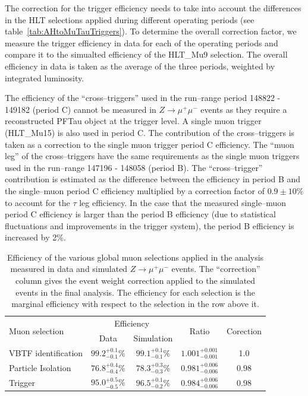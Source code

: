 The correction for the trigger efficiency needs to take into account the
differences in the HLT selections applied during different operating periods
(see table~\ref{tab:AHtoMuTauTriggers}).  To determine the overall correction
factor, we measure the trigger efficiency in data for each of the operating
periods and compare it to the simualted efficiency of the HLT\_Mu9 selection.
The overall efficiency in data is taken as the average of the three periods,
weighted by integrated luminosity.

The efficiency of the ``cross--triggers'' used in the run--range period 148822 -
149182 (period C) cannot be measured in $Z\rightarrow\mu^+\mu^-$ events as they
require a reconstructed PFTau object at the trigger level.  A single muon trigger
(HLT\_Mu15) is also used in period C.  The contribution of the cross--triggers
is taken as a correction to the single muon trigger period C efficiency. The
``muon leg'' of the cross--triggers have the same requirements as the single
muon triggers used in the run--range 147196 - 148058 (period B).  The
``cross--trigger'' contribution is estimated as the difference between the
efficiency in period B and the single--muon period C efficiency multiplied by a
correction factor of $0.9 \pm 10\%$ to account for the $\tau$ leg efficiency.
In the case that the measured single--muon period C efficiency is larger than
the period B efficiency (due to statistical fluctuations and improvements in the
trigger system), the period B efficiency is increased by 2\%.

\begin{table}[t]
\begin{center}
\begin{tabular}{|l|c|c|c|c|}
\hline
\multirow{2}{*}{Muon selection} &  \multicolumn{2}{|c|}{Efficiency} & \multirow{2}{*}{Ratio} & \multirow{2}{*}{Corection} \\ 
&  Data  &          Simulation &      &      \\ 
\hline
VBTF identification &   $99.2^{+0.1}_{-0.1}$\%  &  $99.1^{+0.1}_{-0.1}$\% & $1.001^{+0.001}_{-0.001}$ & 1.0\\
Particle Isolation  &  $76.8^{+0.4}_{-0.4}$\% &  $78.3^{+0.3}_{-0.3}$\% & $0.981^{+0.006}_{-0.006}$ & 0.98 \\
Trigger             &   $95.0^{+0.5}_{-0.5}$\% & $96.5^{+0.1}_{-0.2}$\% & $0.984^{+0.006}_{-0.006}$ & 0.98 \\
\hline
\end{tabular}
\end{center}
\begin{center}
\caption[Muon trigger, identification, and isolation correction
factors]{Efficiency of the various global muon selections applied in the
analysis measured in data and simulated $Z\rightarrow\mu^+\mu^-$ events.  The
``correction'' column gives the event weight correction applied to the simulated
events in the final analysis.  The efficiency for each selection is the marginal
efficiency with respect to the selection in the row above it.  }

\label{tab:muonTagAndProbeResults}
\end{center}
\end{table}

